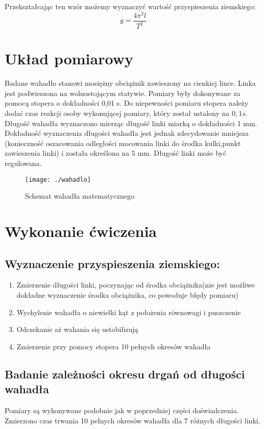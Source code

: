 \documentclass [a4paper,11pt]{article}
\begin{document}
Przekształcając ten wzór możemy wyznaczyć wartość przyspieszenia ziemskiego:
$$ g= \frac{4 \pi^2 l}{T^2} $$


\section{Układ pomiarowy}
Badane wahadło stanowi mosiężny obciążnik zawieszony na cienkiej lince. Linka jest podwieszona na
wolnostojącym statywie. Pomiary były dokonywane za pomocą stopera o dokładności 0,01 s. Do niepewności pomiaru stopera należy dodać czas reakcji osoby wykonującej pomiary, który został ustalony na $0,1 s$. Długość wahadła wyznaczono mierząc
długość linki miarką o dokładności 1 mm. Dokładność wyznaczenia długości wahadła jest jednak zdecydowanie mniejsza (konieczność oszacowania odległości mocowania linki do środka kulki,punkt zawieszenia linki) i została określona na 5 mm. Długość linki może być regulowana.

\begin{figure}[h!]
\centering
\texttt{[image: ./wahadlo]}
\caption{Schemat wahadła matematycznego}
\label{fig:wahadlo}
\end{figure}

\section{Wykonanie ćwiczenia}
 \subsection{Wyznaczenie przyspieszenia ziemskiego:}
\begin{enumerate}
\item Zmierzenie długości linki, poczynając od środka obciążnika(nie jest możliwe dokładne wyznaczenie środka obciążnika, co powoduje błędy pomiaru)
\item Wychylenie wahadła o niewielki kąt z położenia równowagi i puszczenie
\item Odczekanie aż wahania się ustabilizują
\item Zmierzenie przy pomocy stopera 10 pełnych okresów wahadła
\end{enumerate}

 \subsection{Badanie zależności okresu drgań od długości wahadła}
Pomiary są wykonywane podobnie jak w poprzedniej części doświadczenia. Zmierzono czas trwania 10 pełnych okresów wahadła dla 7 różnych długości linki. 
\end{document}
